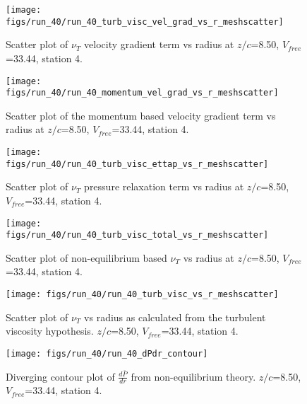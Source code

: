 \begin{figure}[H]
\centering
\texttt{[image: figs/run\_40/run\_40\_turb\_visc\_vel\_grad\_vs\_r\_meshscatter]}
\caption{Scatter plot of $\nu_T$ velocity gradient term vs radius at $z/c$=8.50, $V_{free}$=33.44, station 4.}
\end{figure}


\begin{figure}[H]
\centering
\texttt{[image: figs/run\_40/run\_40\_momentum\_vel\_grad\_vs\_r\_meshscatter]}
\caption{Scatter plot of the momentum based velocity gradient term vs radius at $z/c$=8.50, $V_{free}$=33.44, station 4.}
\end{figure}


\begin{figure}[H]
\centering
\texttt{[image: figs/run\_40/run\_40\_turb\_visc\_ettap\_vs\_r\_meshscatter]}
\caption{Scatter plot of $\nu_T$ pressure relaxation term vs radius at $z/c$=8.50, $V_{free}$=33.44, station 4.}
\end{figure}


\begin{figure}[H]
\centering
\texttt{[image: figs/run\_40/run\_40\_turb\_visc\_total\_vs\_r\_meshscatter]}
\caption{Scatter plot of non-equilibrium based $\nu_T$ vs radius at $z/c$=8.50, $V_{free}$=33.44, station 4.}
\end{figure}


\begin{figure}[H]
\centering
\texttt{[image: figs/run\_40/run\_40\_turb\_visc\_vs\_r\_meshscatter]}
\caption{Scatter plot of $\nu_T$ vs radius as calculated from the turbulent viscosity hypothesis. $z/c$=8.50, $V_{free}$=33.44, station 4.}
\end{figure}


\begin{figure}[H]
\centering
\texttt{[image: figs/run\_40/run\_40\_dPdr\_contour]}
\caption{Diverging contour plot of $\frac{d\bar{P}}{dr}$ from non-equilibrium theory. $z/c$=8.50, $V_{free}$=33.44, station 4.}
\end{figure}


